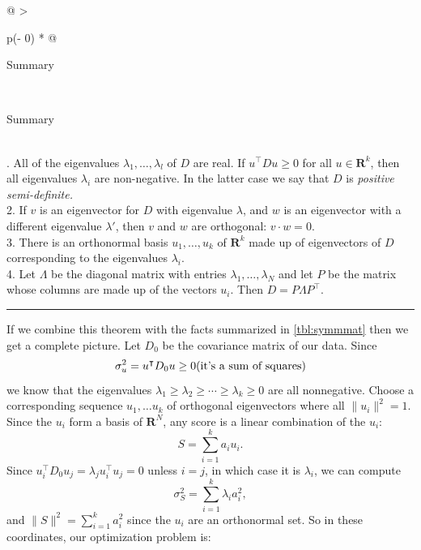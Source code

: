 \documentclass[
  oneside]{scrbook}
\begin{document}
\begin{longtable}[]{@{}
  >{\raggedright\arraybackslash}p{(\columnwidth - 0\tabcolsep) * }@{}}
\caption{Properties of Eigenvalues of Real Symmetric Matrices
\label{tbl:symmmat}}\tabularnewline
\toprule
\begin{minipage}[b]{\linewidth}\raggedright
Summary
\end{minipage} \\
\midrule
\endfirsthead
\toprule
\begin{minipage}[b]{\linewidth}\raggedright
Summary
\end{minipage} \\
\midrule
{}. All of the eigenvalues \(\lambda_{1},\ldots, \lambda_{l}\) of \(D\)
are real. If \(u^{\intercal}Du\ge 0\) for all \(u\in\mathbf{R}^{k}\),
then all eigenvalues \(\lambda_{i}\) are non-negative. In the latter
case we say that \(D\) is \emph{positive semi-definite.} \\
2. If \(v\) is an eigenvector for \(D\) with eigenvalue \(\lambda\), and
\(w\) is an eigenvector with a different eigenvalue \(\lambda'\), then
\(v\) and \(w\) are orthogonal: \(v\cdot w = 0\). \\
3. There is an orthonormal basis \(u_{1},\ldots, u_{k}\) of
\(\mathbf{R}^{k}\) made up of eigenvectors of \(D\) corresponding to the
eigenvalues \(\lambda_{i}\). \\
4. Let \(\Lambda\) be the diagonal matrix with entries
\(\lambda_{1},\ldots, \lambda_{N}\) and let \(P\) be the matrix whose
columns are made up of the vectors \(u_{i}\). Then
\(D = P\Lambda P^{\intercal}.\) \\
\bottomrule
\end{longtable}

\begin{center}\rule{0.5\linewidth}{0.5pt}\end{center}

If we combine this theorem with the facts summarized in
\cref{tbl:symmmat} then we get a complete picture. Let \(D_{0}\) be the
covariance matrix of our data. Since \[
\sigma_{u}^2 = u^{\intercal}D_{0}u\ge 0 \hbox{(it's a sum of squares)}
\] we know that the eigenvalues
\(\lambda_{1}\ge\lambda_{2}\ge \cdots \ge \lambda_{k}\ge 0\) are all
nonnegative. Choose a corresponding sequence \(u_{1},\ldots u_{k}\) of
orthogonal eigenvectors where all \(\|u_{i}\|^2=1\). Since the \(u_{i}\)
form a basis of \(\mathbf{R}^{N}\), any score is a linear combination of
the \(u_{i}\): \[
S = \sum_{i=1}^{k} a_{i}u_{i}.
\] Since
\(u_{i}^{\intercal}D_{0}u_{j} = \lambda_{j}u_{i}^{\intercal}u_{j} = 0\)
unless \(i=j\), in which case it is \(\lambda_{i}\), we can compute \[
\sigma_{S}^2 = \sum_{i=1}^{k} \lambda_{i}a_{i}^2,
\] and \(\|S\|^2=\sum_{i=1}^{k} a_{i}^2\) since the \(u_{i}\) are an
orthonormal set. So in these coordinates, our optimization problem is:
\end{document}
